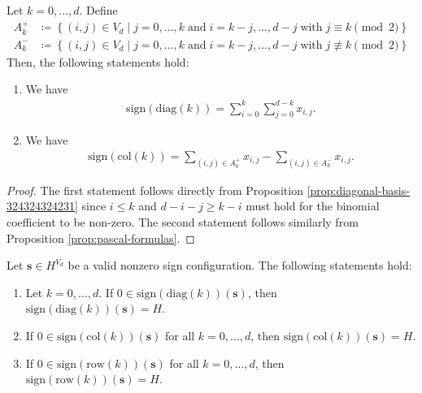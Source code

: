 \begin{proposition}\label{skdmldskfmksdej}
    Let \( k = 0, \dots, d \). Define 
    \begin{align*}
        A_k^+ &\coloneqq \left\{ (i,j) \in V_d \mid j = 0, \dots, k \; \text{and} \; i = k-j, \dots, d-j \; \text{with} \; j \equiv k \pmod 2 \right\} \\
        A_k^- &\coloneqq \left\{ (i,j) \in V_d \mid j = 0, \dots, k \; \text{and} \; i = k-j, \dots, d-j \; \text{with} \; j \not \equiv k \pmod 2 \right\}
    \end{align*}
    Then, the following statements hold:
    \begin{enumerate}
        \item We have 
        \begin{align*}
            \mathrm{sign}(\mathrm{diag}(k)) = \sum_{i=0}^k \sum_{j=0}^{d-k} x_{i,j}.
        \end{align*}

        \item We have 
        \begin{align*}
            \mathrm{sign}(\mathrm{col}(k)) = \sum_{(i,j) \in A_k^+} x_{i,j} - \sum_{(i,j) \in A_k^-} x_{i,j}.
        \end{align*}
    \end{enumerate}
\end{proposition}

\begin{proof}
    The first statement follows directly from Proposition \ref{prop:diagonal-basis-324324324231} since \( i \leq k \) and \( d - i - j \geq k - i \) must hold for the binomial coefficient to be non-zero. The second statement follows similarly from Proposition \ref{prop:pascal-formulas}.
\end{proof}

\begin{proposition}\label{prop:sign-sikjsfnf322}
    Let \( \mathbf{s} \in H^{V_d} \) be a valid nonzero sign configuration. The following statements hold:
    \begin{enumerate}
        \item Let \( k = 0, \dots, d \). If \( 0 \in \mathrm{sign}(\mathrm{diag}(k))(\mathbf{s})  \), then \( \mathrm{sign}(\mathrm{diag}(k))(\mathbf{s}) = H \).
        \item If \( 0 \in \mathrm{sign}(\mathrm{col}(k))(\mathbf{s}) \) for all \( k = 0, \dots, d \), then \( \mathrm{sign}(\mathrm{col}(k))(\mathbf{s}) = H \).
        \item If \( 0 \in \mathrm{sign}(\mathrm{row}(k))(\mathbf{s}) \) for all \( k = 0, \dots, d \), then \( \mathrm{sign}(\mathrm{row}(k))(\mathbf{s}) = H \).
    \end{enumerate}
\end{proposition}

